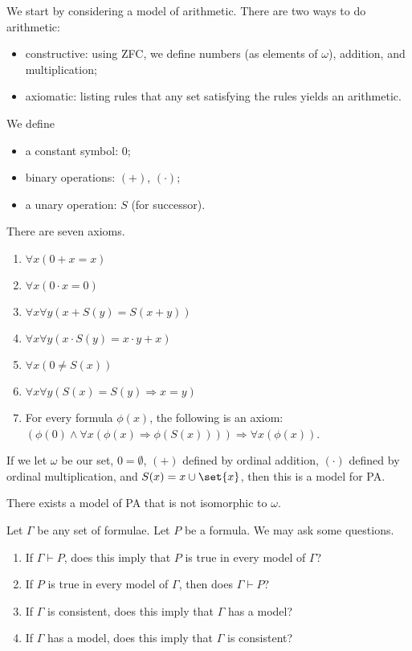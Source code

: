 \documentclass[10pt]{mypackage}
\begin{document}
We start by considering a model of arithmetic. There are two ways to do arithmetic:
\begin{itemize}
  \item constructive: using ZFC, we define numbers (as elements of $\omega$), addition, and multiplication;
  \item axiomatic: listing rules that any set satisfying the rules yields an arithmetic.
\end{itemize}
\begin{definition}
  We define
  \begin{itemize}
    \item a constant symbol: $0$;
    \item binary operations: $\left(+\right)$, $\left(\cdot\right)$;
    \item a unary operation: $S$ (for successor).
  \end{itemize}
  There are seven axioms.
  \begin{enumerate}[(1)]
    \item $\forall x \left(0 + x = x\right)$
    \item $\forall x \left(0\cdot x = 0\right)$
    \item $\forall x \forall y \left(x + S\left(y\right) = S\left(x+y\right)\right)$
    \item $\forall x \forall y \left(x\cdot S(y) = x\cdot y + x\right)$
    \item $\forall x \left(0 \neq S(x)\right)$
    \item $\forall x \forall y \left(S(x) = S(y) \Rightarrow x=y\right)$
    \item For every formula $\phi(x)$, the following is an axiom: $\left(\phi(0) \wedge \forall x \left(\phi(x)\Rightarrow \phi\left(S(x)\right)\right)\right)\Rightarrow \forall x \left(\phi(x)\right)$.
  \end{enumerate}
\end{definition}
\begin{theorem}
  If we let $\omega$ be our set, $0 = \emptyset$, $\left(+\right)$ defined by ordinal addition, $\left(\cdot\right)$ defined by ordinal multiplication, and $S(x) = x\cup \set{x}$, then this is a model for PA.
\end{theorem}
\begin{theorem}
  There exists a model of PA that is not isomorphic to $\omega$.
\end{theorem}
Let $\Gamma$ be any set of formulae. Let $P$ be a formula. We may ask some questions.
\begin{enumerate}[(1)]
  \item If $\Gamma \vdash P$, does this imply that $P$ is true in every model of $\Gamma$?
  \item If $P$ is true in every model of $\Gamma$, then does $\Gamma \vdash P$?
  \item If $\Gamma$ is consistent, does this imply that $\Gamma$ has a model?
  \item If $\Gamma$ has a model, does this imply that $\Gamma$ is consistent?
\end{enumerate}
\end{document}
